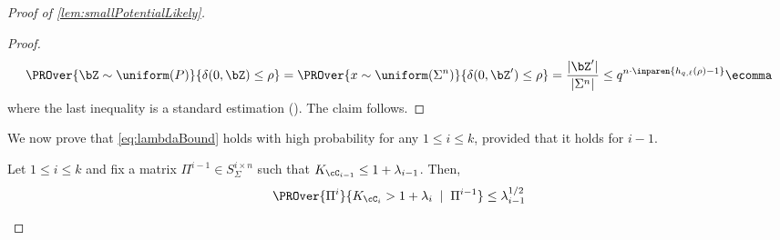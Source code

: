 \documentclass[11pt]{article}
\begin{document}
\begin{proof}[Proof of \cref{lem:smallPotentialLikely}]
\begin{proof}
        $$\PROver{\bZ \sim \uniform(P)}{\delta(0,\bZ)\le \rho} = \PROver{x \sim \uniform(\Sigma^n)}{\delta(0,\bZ')\le \rho} = \frac{|\bZ'|}{|\Sigma^n|} \le q^{n\cdot \inparen{h_{q,\ell}(\rho)-1}}\ecomma$$
        where the last inequality is a standard estimation (\cite[Prop.\ 2.4.11]{Resch2020}). The claim follows.        
    \end{proof}
    We now prove that \cref{eq:lambdaBound} holds with high probability for any $1\le i\le k$, provided that it holds for $i-1$.
    \begin{claim}\label{claim:Step}
        Let $1\le i\le k$ and fix a matrix $\Pi^{i-1}\in S_\Sigma^{i\times n}$ such that $K_{\cC_{i-1}} \le 1 + \lambda_{i-1}$. Then, 
        $$\PROver{\Pi^i}{K_{\cC_i} > 1+\lambda_i\;\mid\;\Pi^{i-1}} \le \lambda_{i-1}^{1/2}$$
    \end{claim}


\end{proof}
\end{document}
